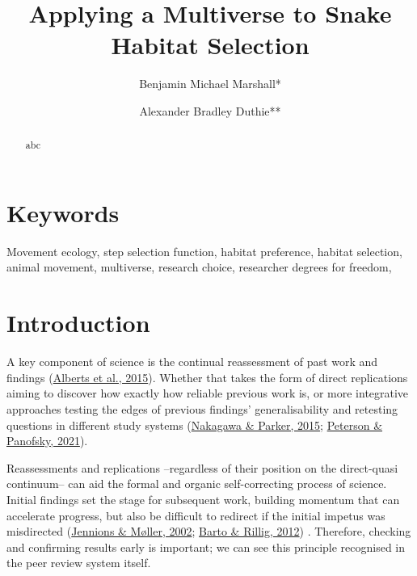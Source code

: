 \documentclass[10pt,a4paper]{article}
\begin{document}
\pagestyle{fancy}

\title{Applying a Multiverse to Snake Habitat Selection}
\author[1]{Benjamin Michael Marshall*}
\author[1]{Alexander Bradley Duthie**}


\maketitle
\thispagestyle{fancy}

\begin{abstract}

abc

\end{abstract}

\section*{Keywords}

Movement ecology, step selection function, habitat preference, habitat selection, animal movement, multiverse, research choice, researcher degrees for freedom,

\clearpage
\pagestyle{fancy}

\hypertarget{introduction}{%
\section{Introduction}\label{introduction}}

A key component of science is the continual reassessment of past work and findings (\protect\hyperlink{ref-alberts_self-correction_2015}{Alberts et al., 2015}).
Whether that takes the form of direct replications aiming to discover how exactly how reliable previous work is, or more integrative approaches testing the edges of previous findings' generalisability and retesting questions in different study systems (\protect\hyperlink{ref-nakagawa_replicating_2015}{Nakagawa \& Parker, 2015}; \protect\hyperlink{ref-peterson_self-correction_2021}{Peterson \& Panofsky, 2021}).

Reassessments and replications --regardless of their position on the direct-quasi continuum-- can aid the formal and organic self-correcting process of science.
Initial findings set the stage for subsequent work, building momentum that can accelerate progress, but also be difficult to redirect if the initial impetus was misdirected (\protect\hyperlink{ref-jennions_relationships_2002}{Jennions \& Møller, 2002}; \protect\hyperlink{ref-barto_dissemination_2012}{Barto \& Rillig, 2012}) .
Therefore, checking and confirming results early is important; we can see this principle recognised in the peer review system itself.
\end{document}
